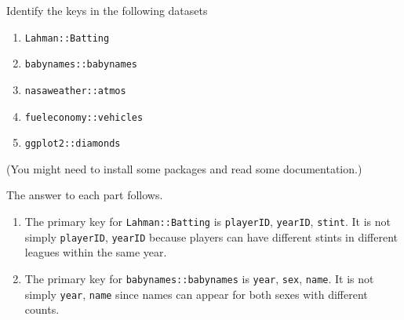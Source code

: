 \documentclass[]{book}
\newenvironment{Shaded}{\begin{snugshade}}{\end{snugshade}}
\newcommand{\CommentTok}[1]{\textcolor[rgb]{0.56,0.35,0.01}{\textit{#1}}}
\newcommand{\DecValTok}[1]{\textcolor[rgb]{0.00,0.00,0.81}{#1}}
\newcommand{\KeywordTok}[1]{\textcolor[rgb]{0.13,0.29,0.53}{\textbf{#1}}}
\newcommand{\NormalTok}[1]{#1}
\newcommand{\OperatorTok}[1]{\textcolor[rgb]{0.81,0.36,0.00}{\textbf{#1}}}
\newcommand{\StringTok}[1]{\textcolor[rgb]{0.31,0.60,0.02}{#1}}
\providecommand{\tightlist}{%
  \setlength{\itemsep}{0pt}\setlength{\parskip}{0pt}}
\theoremstyle{plain}
\theoremstyle{remark}
\begin{document}
Identify the keys in the following datasets

\begin{enumerate}
\def\labelenumi{\arabic{enumi}.}
\tightlist
\item
  \texttt{Lahman::Batting}
\item
  \texttt{babynames::babynames}
\item
  \texttt{nasaweather::atmos}
\item
  \texttt{fueleconomy::vehicles}
\item
  \texttt{ggplot2::diamonds}
\end{enumerate}

(You might need to install some packages and read some documentation.)

The answer to each part follows.

\begin{enumerate}
\def\labelenumi{\arabic{enumi}.}
\item
  The primary key for \texttt{Lahman::Batting} is \texttt{playerID},
  \texttt{yearID}, \texttt{stint}. It is not simply \texttt{playerID},
  \texttt{yearID} because players can have different stints in different
  leagues within the same year.

\begin{Shaded}
\end{Shaded}
\item
  The primary key for \texttt{babynames::babynames} is \texttt{year},
  \texttt{sex}, \texttt{name}. It is not simply \texttt{year},
  \texttt{name} since names can appear for both sexes with different
  counts.

\begin{Shaded}
\end{Shaded}


\end{enumerate}
\end{document}
